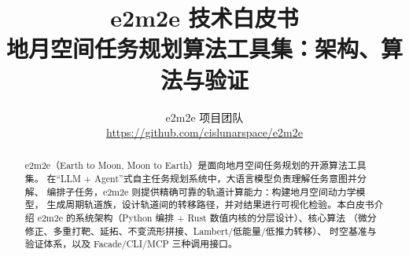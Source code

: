 \documentclass[UTF8,11pt]{ctexart}
\title{\color{e2blue}\textbf{e2m2e 技术白皮书}\\[4pt]
  \large 地月空间任务规划算法工具集：架构、算法与验证}
\author{e2m2e 项目团队 \\ \small \url{https://github.com/cislunarspace/e2m2e}}
\date{\eEmVersion}
\begin{document}
\maketitle
\thispagestyle{empty}

\begin{abstract}
\noindent
e2m2e（Earth to Moon, Moon to Earth）是面向地月空间任务规划的开源算法工具集。
在“LLM + Agent”式自主任务规划系统中，大语言模型负责理解任务意图并分解、
编排子任务，e2m2e 则提供精确可靠的轨道计算能力：构建地月空间动力学模型，
生成周期轨道族，设计轨道间的转移路径，并对结果进行可视化检验。本白皮书介绍
e2m2e 的系统架构（Python 编排 + Rust 数值内核的分层设计）、核心算法
（微分修正、多重打靶、延拓、不变流形拼接、Lambert/低能量/低推力转移）、
时空基准与验证体系，以及 Facade/CLI/MCP 三种调用接口。
\end{abstract}

\vspace{1em}
\tableofcontents
\newpage










\end{document}
